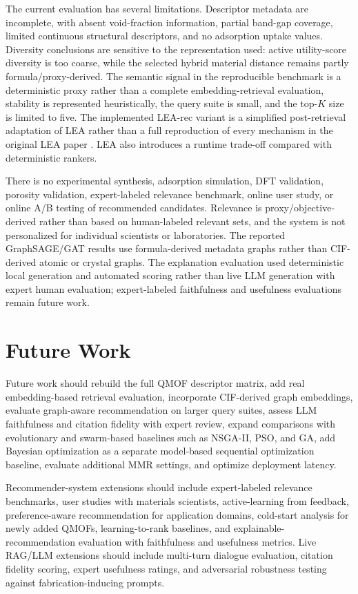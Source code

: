 \documentclass[12pt,a4paper]{article}
\begin{document}
The current evaluation has several limitations. Descriptor metadata are incomplete, with absent void-fraction information, partial band-gap coverage, limited continuous structural descriptors, and no adsorption uptake values. Diversity conclusions are sensitive to the representation used: active utility-score diversity is too coarse, while the selected hybrid material distance remains partly formula/proxy-derived. The semantic signal in the reproducible benchmark is a deterministic proxy rather than a complete embedding-retrieval evaluation, stability is represented heuristically, the query suite is small, and the top-$K$ size is limited to five. The implemented LEA-rec variant is a simplified post-retrieval adaptation of LEA rather than a full reproduction of every mechanism in the original LEA paper \cite{dalirinia2024}. LEA also introduces a runtime trade-off compared with deterministic rankers.

There is no experimental synthesis, adsorption simulation, DFT validation, porosity validation, expert-labeled relevance benchmark, online user study, or online A/B testing of recommended candidates. Relevance is proxy/objective-derived rather than based on human-labeled relevant sets, and the system is not personalized for individual scientists or laboratories. The reported GraphSAGE/GAT results use formula-derived metadata graphs rather than CIF-derived atomic or crystal graphs. The explanation evaluation used deterministic local generation and automated scoring rather than live LLM generation with expert human evaluation; expert-labeled faithfulness and usefulness evaluations remain future work.

\section{Future Work}
\label{sec:future}

Future work should rebuild the full QMOF descriptor matrix, add real embedding-based retrieval evaluation, incorporate CIF-derived graph embeddings, evaluate graph-aware recommendation on larger query suites, assess LLM faithfulness and citation fidelity with expert review, expand comparisons with evolutionary and swarm-based baselines such as NSGA-II, PSO, and GA, add Bayesian optimization as a separate model-based sequential optimization baseline, evaluate additional MMR settings, and optimize deployment latency.

Recommender-system extensions should include expert-labeled relevance benchmarks, user studies with materials scientists, active-learning from feedback, preference-aware recommendation for application domains, cold-start analysis for newly added QMOFs, learning-to-rank baselines, and explainable-recommendation evaluation with faithfulness and usefulness metrics. Live RAG/LLM extensions should include multi-turn dialogue evaluation, citation fidelity scoring, expert usefulness ratings, and adversarial robustness testing against fabrication-inducing prompts.
\end{document}
